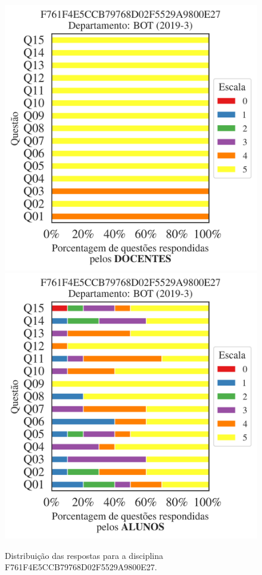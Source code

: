 \documentclass[a4paper,10pt]{article}
\begin{document}
\begin{figure}[h]
\centering
\includegraphics[width=0.485\linewidth]{analise_disciplina_departamento_BOT_F761F4E5CCB79768D02F5529A9800E27_docentes.png}
\includegraphics[width=0.485\linewidth]{analise_disciplina_departamento_BOT_F761F4E5CCB79768D02F5529A9800E27_alunos.png}
\caption{\label{fig:analise_geral_departamento}                Distribuição das respostas para a disciplina F761F4E5CCB79768D02F5529A9800E27. }
\end{figure}
\end{document}
